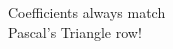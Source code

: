 \documentclass[preview]{standalone}
\begin{document}
\begin{center}
Coefficients always match\\Pascal's Triangle row!
\end{center}
\end{document}
